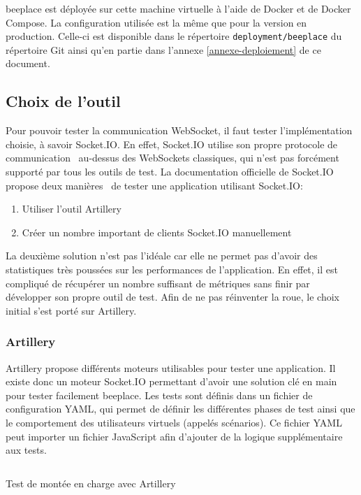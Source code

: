 \gls{beeplace} est déployée sur cette machine virtuelle à l'aide de Docker et de Docker Compose. La configuration utilisée est la même que pour la version en production. Celle-ci est disponible dans le répertoire \texttt{deployment/beeplace} du répertoire Git ainsi qu'en partie dans l'annexe \ref{annexe-deploiement} de ce document.

\subsection{Choix de l'outil}

Pour pouvoir tester la communication WebSocket, il faut tester l'implémentation choisie, à savoir Socket.IO. En effet, Socket.IO utilise son propre protocole de communication~\cite{socket-io-protocol} au-dessus des WebSockets classiques, qui n'est pas forcément supporté par tous les outils de test. La documentation officielle de Socket.IO propose deux manières~\cite{socket-io-load-testing} de tester une application utilisant Socket.IO:

\begin{enumerate}
  \item Utiliser l'outil Artillery~\cite{artillery}
  \item Créer un nombre important de clients Socket.IO manuellement
\end{enumerate}

La deuxième solution n'est pas l'idéale car elle ne permet pas d'avoir des statistiques très poussées sur les performances de l'application. En effet, il est compliqué de récupérer un nombre suffisant de métriques sans finir par développer son propre outil de test. Afin de ne pas réinventer la roue, le choix initial s'est porté sur Artillery.

\subsubsection{Artillery}

Artillery propose différents moteurs utilisables pour tester une application. Il existe donc un moteur Socket.IO permettant d'avoir une solution clé en main pour tester facilement \gls{beeplace}. Les tests sont définis dans un fichier de configuration YAML, qui permet de définir les différentes phases de test ainsi que le comportement des utilisateurs virtuels (appelés scénarios). Ce fichier YAML peut importer un fichier JavaScript afin d'ajouter de la logique supplémentaire aux tests.

\begin{listing}[h]
  \inputminted[linenos]{yaml}{assets/figures/artillery-test.yml}
  \caption{Test de montée en charge avec Artillery}
  \label{listing:artillery}
\end{listing}

